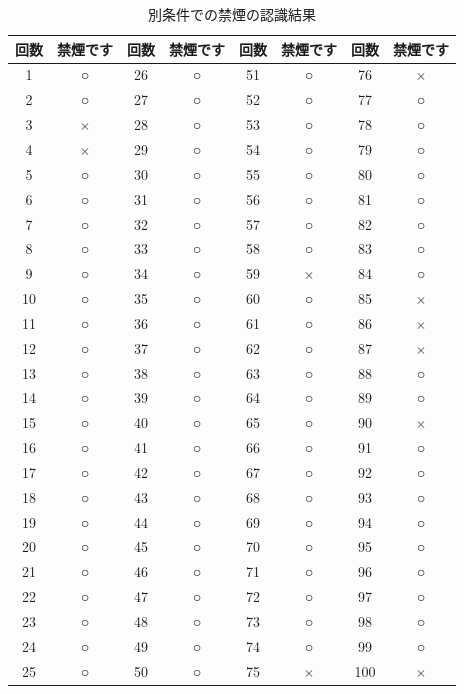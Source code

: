 \documentclass[12pt,oneside]{sotsuken_paper}
\begin{document}
\begin{table}[htb]
\begin{center}
\caption{別条件での禁煙の認識結果}
\begin{tabular}{|c|c|c|c|c|c|c|c|}\hline
回数&禁煙です&回数&禁煙です&回数&禁煙です&回数&禁煙です\\\hline
1&○&26&○&51&○&76&$\times$\\\hline
2&○&27&○&52&○&77&○\\\hline
3&$\times$&28&○&53&○&78&○\\\hline
4&$\times$&29&○&54&○&79&○\\\hline
5&○&30&○&55&○&80&○\\\hline
6&○&31&○&56&○&81&○\\\hline
7&○&32&○&57&○&82&○\\\hline
8&○&33&○&58&○&83&○\\\hline
9&○&34&○&59&$\times$&84&○\\\hline
10&○&35&○&60&○&85&$\times$\\\hline
11&○&36&○&61&○&86&$\times$\\\hline
12&○&37&○&62&○&87&$\times$\\\hline
13&○&38&○&63&○&88&○\\\hline
14&○&39&○&64&○&89&○\\\hline
15&○&40&○&65&○&90&$\times$\\\hline
16&○&41&○&66&○&91&○\\\hline
17&○&42&○&67&○&92&○\\\hline
18&○&43&○&68&○&93&○\\\hline
19&○&44&○&69&○&94&○\\\hline
20&○&45&○&70&○&95&○\\\hline
21&○&46&○&71&○&96&○\\\hline
22&○&47&○&72&○&97&○\\\hline
23&○&48&○&73&○&98&○\\\hline
24&○&49&○&74&○&99&○\\\hline
25&○&50&○&75&$\times$&100&$\times$
\\\hline
\end{tabular}
\label{tab:another-nosmokerecogresult}
\end{center}
\end{table}
\end{document}
